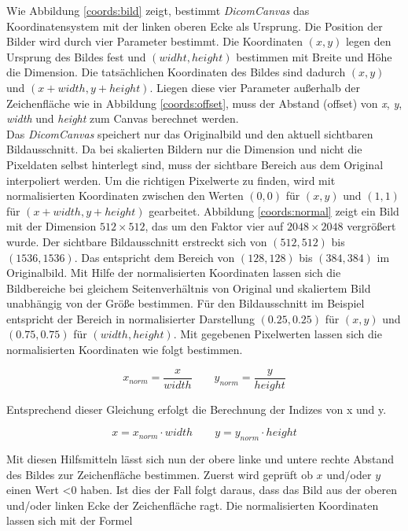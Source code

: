 Wie Abbildung \ref{coords:bild} zeigt, bestimmt \textit{DicomCanvas} das Koordinatensystem mit der linken oberen Ecke als Ursprung. Die Position der Bilder wird durch vier Parameter bestimmt. Die Koordinaten $(x, y)$ legen den Ursprung des Bildes fest und $(widht, height)$ bestimmen mit Breite und Höhe die Dimension. Die tatsächlichen Koordinaten des Bildes sind dadurch $(x, y)$ und $(x+width, y+height)$. Liegen diese vier Parameter außerhalb der Zeichenfläche wie in Abbildung \ref{coords:offset}, muss der Abstand (offset) von \textit{x}, \textit{y}, \textit{width} und \textit{height} zum Canvas berechnet werden.\\
Das \textit{DicomCanvas} speichert nur das Originalbild und den aktuell sichtbaren Bildausschnitt. Da bei skalierten Bildern nur die Dimension und nicht die Pixeldaten selbst hinterlegt sind, muss der sichtbare Bereich aus dem Original interpoliert werden. Um die richtigen Pixelwerte zu finden, wird mit normalisierten Koordinaten zwischen den Werten $(0, 0)$ für $(x,y)$ und $(1, 1)$ für $(x+width, y+height)$ gearbeitet. Abbildung \ref{coords:normal} zeigt ein Bild mit der Dimension $512 \times 512$, das um den Faktor vier auf $2048\times2048$ vergrößert wurde. Der sichtbare Bildausschnitt erstreckt sich von $(512, 512)$ bis $(1536, 1536)$. Das entspricht dem Bereich von $(128, 128)$ bis $(384, 384)$ im Originalbild. Mit Hilfe der normalisierten Koordinaten lassen sich die Bildbereiche bei gleichem Seitenverhältnis von Original und skaliertem Bild unabhängig von der Größe bestimmen. Für den Bildausschnitt im Beispiel entspricht der Bereich in normalisierter Darstellung $(0.25, 0.25)$ für $(x,y)$ und $(0.75, 0.75)$ für $(width, height)$. Mit gegebenen Pixelwerten lassen sich die normalisierten Koordinaten wie folgt bestimmen.

\begin{equation}
 x_{norm} = \frac{x}{width} \qquad
 y_{norm} = \frac{y}{height}
\end{equation}

Entsprechend dieser Gleichung erfolgt die Berechnung der Indizes von x und y.

\begin{equation}
 x = x_{norm} \cdot width \qquad
 y = y_{norm} \cdot height
\end{equation}

Mit diesen Hilfsmitteln lässt sich nun der obere linke und untere rechte Abstand des Bildes zur Zeichenfläche bestimmen. Zuerst wird geprüft ob $x$ und/oder $y$ einen Wert \textless 0 haben. Ist dies der Fall folgt daraus, dass das Bild aus der oberen und/oder linken Ecke der Zeichenfläche ragt. Die normalisierten Koordinaten lassen sich mit der Formel

